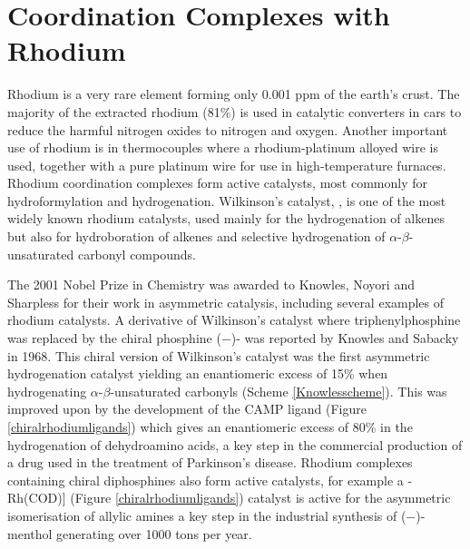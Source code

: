 
\chapter{Coordination Complexes with Rhodium}
\label{ch:rhodium}

Rhodium is a very rare element forming only 0.001 ppm of the earth's crust.\cite{Enghag2004Rhabundance}  The majority of the extracted rhodium (81\%) is used in catalytic converters in cars to reduce the harmful nitrogen oxides to nitrogen and oxygen.  Another important use of rhodium is in thermocouples where a rhodium-platinum alloyed wire is used, together with a pure platinum wire for use in high-temperature furnaces.\cite{Enghag2004Rh}  Rhodium coordination complexes form active catalysts, most commonly for hydroformylation and hydrogenation.  Wilkinson's catalyst, , is one of the most widely known rhodium catalysts, used mainly for the hydrogenation of alkenes but also for hydroboration of alkenes and selective hydrogenation of $\alpha$-$\beta$-unsaturated carbonyl compounds.  

The 2001 Nobel Prize in Chemistry was awarded to Knowles,\cite{Knowles2002} Noyori\cite{Noyori2002} and Sharpless\cite{Sharpless2002} for their work in asymmetric catalysis, including several examples of rhodium catalysts.  A derivative of Wilkinson's catalyst where triphenylphosphine was replaced by the chiral phosphine ($-$)- was reported by Knowles and Sabacky in 1968\cite{Knowles1968}.  This chiral version of Wilkinson's catalyst was the first asymmetric hydrogenation catalyst yielding an enantiomeric excess of 15\% when hydrogenating $\alpha$-$\beta$-unsaturated carbonyls (Scheme \ref{Knowlesscheme}).  This was improved upon by the development of the CAMP ligand (Figure \ref{chiralrhodiumligands}) which gives an enantiomeric excess of 80\% in the hydrogenation of dehydroamino acids, a key step in the commercial production of   a drug used in the treatment of Parkinson's disease.\cite{Noyori2007}  Rhodium complexes containing chiral diphosphines also form active catalysts, for example a \iupac{[\cip{S}-BINAP}-Rh(COD)] (Figure \ref{chiralrhodiumligands}) catalyst is active for the asymmetric isomerisation of allylic amines a key step in the industrial synthesis of ($-$)-menthol generating over 1000 tons per year.\cite{Noyori2002}

